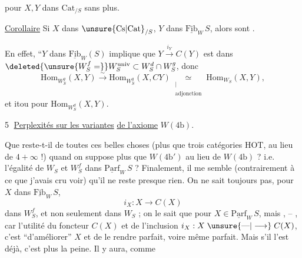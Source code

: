 pour $X,Y$ dans $\mathrm{Cat}_{/S}$ sans plus.

\uline{Corollaire} Si $X$ dans $\unsure{\mathrm{Cs}|\mathrm{Cat}}_{/S}$, $Y$ dans $\underline{\mathrm{Fib}}_W\,S$, alors
sont .

En effet, ``$Y$ dans $\underline{\mathrm{Fib}}_W(S)$ implique que $Y\xrightarrow{i_Y}C(Y)$ est
dans $\deleted{\unsure{W_S^f=}}W_S^{\mathrm{univ}}\subset W_S^d\cap W_S^g$, donc
\[
\mathrm{Hom}_{W_S^g}(X,Y)\xrightarrow{\sim}\mathrm{Hom}_{W_S^g}(X,CY)
\mathrel{\underset{\substack{\vert\\\text{adjonction}}}{\simeq}}\mathrm{Hom}_{W_S}(X,Y),
\]
et itou pour $\mathrm{Hom}_{W_S^d}(X,Y)$.

\textcircled{5}  \uline{Perplexités sur les variantes}  \uline{de l'axiome} $W(4\mathrm b)$.

Que reste-t-il de toutes ces belles choses (plus
que trois catégories $\mathrm{HOT}$, au lieu de $4+\infty$ !) quand
on  suppose plus que $W(4\mathrm b')$ au lieu de $W(4\mathrm b)$ ?
i.e. l'égalité de $W_S$ et $W_S^f$ dans $\underline{\mathrm{Parf}}_W\,S$ ?
Finalement, il me semble (contrairement à ce que
j'avais cru voir) qu'il ne reste presque rien.
On ne sait  toujours pas, pour $X$ dans $\underline{\mathrm{Fib}}_W\,S$,
\[
i_X:X\longrightarrow C(X)
\]
dans $W_S^f$, et non seulement dans $W_S$ ; on
le sait que pour $X\in\underline{\mathrm{Parf}}_W\,S$, mais
,  -- , car l'utilité
du foncteur $C(X)$ et de l'inclusion $i_X:X\mathrel{\unsure{\text{---}|\longrightarrow}}C(X)$,
c'est ``d'améliorer'' $X$ et de le rendre
parfait, voire même  parfait. Mais s'il l'est
déjà, c'est plus la peine. Il y aura, comme
